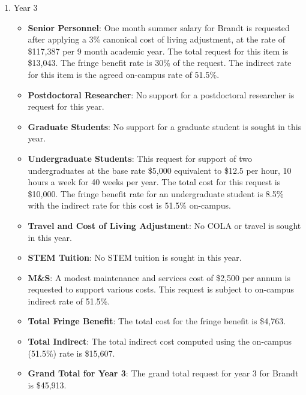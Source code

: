 \begin{enumerate}
\item{Year 3}
\begin{itemize}[noitemsep,nolistsep]
\item{{\bf Senior Personnel}: One month summer salary for Brandt is requested after applying a 3\% canonical cost of living adjustment, at the rate of \$117,387 per 9 month academic year.  The total request for this item is \$13,043.   The fringe benefit rate is 30\% of the request.  The indirect rate for this item is the agreed on-campus rate of 51.5\%.}

\item {{\bf Postdoctoral Researcher}: No support for a postdoctoral researcher is request for this year.} 

\item{{\bf Graduate Students}: No support for a graduate student is sought in this year.}

\item {{\bf Undergraduate Students}: This request for support of two undergraduates at the base rate \$5,000 equivalent to \$12.5 per hour, 10 hours a week for 40 weeks per year.  The total cost for this request is \$10,000.  The fringe benefit rate for an undergraduate student is 8.5\% with the indirect rate for this cost is 51.5\% on-campus.}

\item{{\bf Travel and Cost of Living Adjustment}: No COLA or travel is sought in this year.}  


\item {{\bf STEM Tuition}: No STEM tuition is sought in this year.}

\item {{\bf M\&S}: A modest maintenance and services cost of \$2,500 per annum is requested to support various costs.   This request is subject to on-campus indirect rate of 51.5\%.}

\item {{\bf Total Fringe Benefit}: The total cost for the fringe benefit is \$4,763.}

\item {{\bf Total Indirect}: The total indirect cost computed using the on-campus (51.5\%) rate is \$15,607.}

\item {{\bf Grand Total for Year 3}: The grand total request for year 3 for Brandt is \$45,913.}

\end{itemize}

\end{enumerate}

